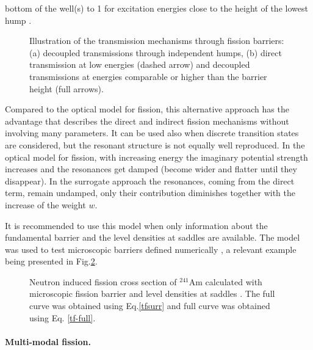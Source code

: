 bottom of the well(s) to 1 for excitation energies close to the height of
the lowest hump \cite{Sin:07}.
\begin{figure}[htbp]
\caption{Illustration of the transmission mechanisms through fission
barriers: (a) decoupled transmissions through independent humps, (b) direct
transmission at low energies (dashed arrow) and decoupled transmissions at
energies comparable or higher than the barrier height (full arrows).}
\label{fis-ld0.eps}
\end{figure}
Compared to the optical model for fission, this alternative approach has the
advantage that describes the direct and indirect fission mechanisms without
involving many parameters. It can be used also when discrete transition
states are considered, but the resonant structure is not equally well
reproduced. In the optical model for fission, with increasing energy the
imaginary potential strength increases and the resonances get damped (become
wider and flatter until they disappear). In the surrogate approach the
resonances, coming from the direct term, remain undamped, only their
contribution diminishes together with the increase of the weight $w$.

It is recommended to use this model when only information about the
fundamental barrier and the level densities at saddles are available. The
model was used to test microscopic barriers defined numerically \cite{Sin:07}%
, a relevant example being presented in Fig.\ref{am41-surr}.
\begin{figure}[htbp]
\caption{Neutron induced fission cross section of $^{241}$Am calculated with
microscopic fission barrier \protect\cite{Goriely:07-mass} and level
densities at saddles \protect\cite{Goriely:07-ld}. The full curve was
obtained using Eq.\protect\ref{tfsurr} and full curve was obtained using Eq.%
\protect\ref{tf-full}.}
\label{am41-surr}
\end{figure}

\medskip %

\paragraph*{Multi-modal fission.}

